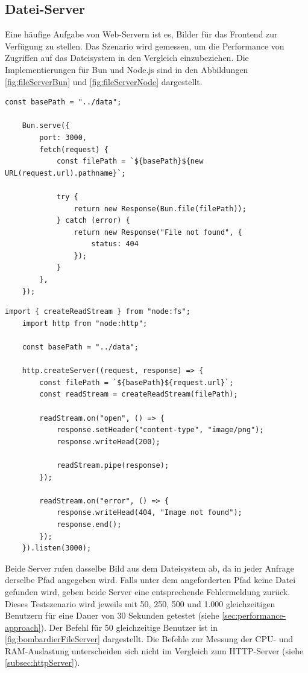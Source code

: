 \subsection{Datei-Server} \label{subsec:fileServer}
Eine häufige Aufgabe von Web-Servern ist es, Bilder für das Frontend zur Verfügung zu stellen. Das Szenario wird gemessen, um die Performance von Zugriffen auf das Dateisystem in den Vergleich einzubeziehen. \newline
Die Implementierungen für Bun und Node.js sind in den Abbildungen \ref{fig:fileServerBun} und \ref{fig:fileServerNode} dargestellt.

\begin{lstlisting}[caption={[Datei-Server Bun]Datei-Server Bun\\\textit{Quelle: Eigene Darstellung}},label={fig:fileServerBun}]
	const basePath = "../data";
	
	Bun.serve({
		port: 3000,
		fetch(request) {
			const filePath = `${basePath}${new URL(request.url).pathname}`;
			
			try {
				return new Response(Bun.file(filePath));
			} catch (error) {
				return new Response("File not found", {
					status: 404
				});
			}
		},
	});
\end{lstlisting}

\begin{lstlisting}[caption={[Datei-Server Node.js]Datei-Server Node.js\\\textit{Quelle: Eigene Darstellung}},label={fig:fileServerNode}]
	import { createReadStream } from "node:fs";
	import http from "node:http";
	
	const basePath = "../data";
	
	http.createServer((request, response) => {
		const filePath = `${basePath}${request.url}`;
		const readStream = createReadStream(filePath);
		
		readStream.on("open", () => {
			response.setHeader("content-type", "image/png");
			response.writeHead(200);
			
			readStream.pipe(response);
		});
		
		readStream.on("error", () => {
			response.writeHead(404, "Image not found");
			response.end();
		});
	}).listen(3000);
\end{lstlisting}

\noindent
Beide Server rufen dasselbe Bild aus dem Dateisystem ab, da in jeder Anfrage derselbe Pfad angegeben wird. Falls unter dem angeforderten Pfad keine Datei gefunden wird, geben beide Server eine entsprechende Fehlermeldung zurück. Dieses Testszenario wird jeweils mit 50, 250, 500 und 1.000 gleichzeitigen Benutzern für eine Dauer von 30 Sekunden getestet (siehe \autoref{sec:performance-approach}). Der Befehl für 50 gleichzeitige Benutzer ist in \autoref{fig:bombardierFileServer} dargestellt. Die Befehle zur Messung der CPU- und RAM-Auslastung unterscheiden sich nicht im Vergleich zum HTTP-Server (siehe \autoref{subsec:httpServer}).

